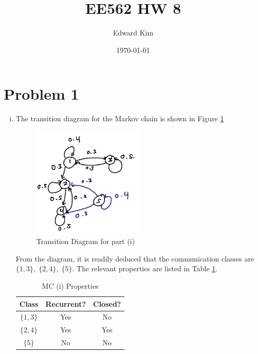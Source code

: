 \documentclass[12pt]{article}%
\title{EE562 HW 8}
\author{Edward Kim}
\date{\today}
\begin{document}
\maketitle

\section{Problem 1}
\label{sec:prob_one}

\begin{enumerate}[i.]
  \item The transition diagram for the Markov chain is shown in Figure \ref{fig:mc1}

        \begin{figure}[h]
          \centering
          \includegraphics[width=0.5\textwidth]{mc1}
          \caption{Transition Diagram for part (i)}
          \label{fig:mc1}
        \end{figure}

        From the diagram, it is readily deduced that the communication classes are $\{1,3\}, \; \{2,4\}, \; \{5\}$. The relevant properties are listed in Table \ref{tab:mc1}.
        \begin{table}[htbp]
          \centering
          \begin{tabular}{|c|c|c|}
            \hline
            Class & Recurrent? & Closed? \\
            \hline
            $\{1,3\}$ & Yes & No \\
            \hline
            $\{2,4\}$ & Yes & Yes \\
            \hline
            $\{5\}$ & No & No \\
             \hline
          \end{tabular}
          \caption{MC (i) Properties}
          \label{tab:mc1}
        \end{table}


\end{enumerate}
\end{document}
